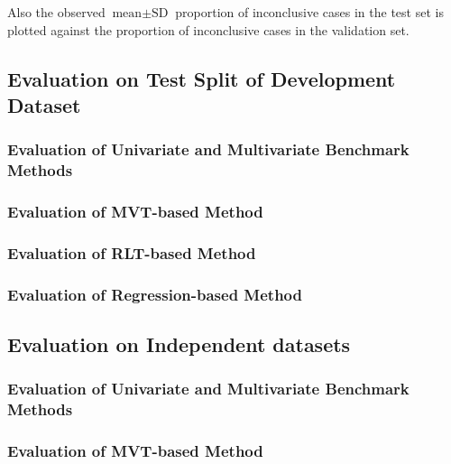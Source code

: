 Also the observed $\text{mean} \pm \text{SD}$ proportion of inconclusive cases in the test set is plotted 
against the proportion of inconclusive cases in the validation set.


\subsection{Evaluation on Test Split of Development Dataset}
\label{subsec:eval_dev}


\subsubsection{Evaluation of Univariate and Multivariate Benchmark Methods}
\label{subsubsec:eval_dev}


\subsubsection{Evaluation of MVT-based Method}
\label{subsubsec:eval_mvt}


\subsubsection{Evaluation of RLT-based Method}
\label{subsubsec:eval_rlt}


\subsubsection{Evaluation of Regression-based Method}
\label{subsubsec:eval_regression}



\subsection{Evaluation on Independent datasets}
\label{subsec:eval_independent}


\subsubsection{Evaluation of Univariate and Multivariate Benchmark Methods}
\label{subsubsec:eval_dev_indep}


\subsubsection{Evaluation of MVT-based Method}
\label{subsubsec:eval_mvt_indep}


